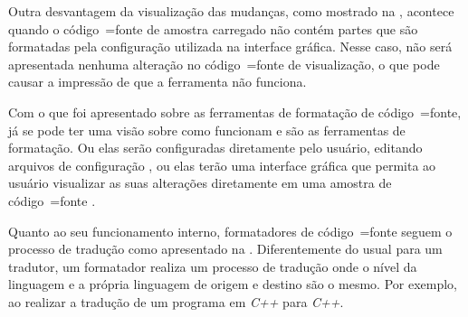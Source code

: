 Outra desvantagem da visualização das mudanças,
como mostrado na ,
acontece quando o código~=fonte de amostra carregado não contém partes que são formatadas pela configuração utilizada na interface gráfica.
Nesse caso,
não será apresentada nenhuma alteração no código~=fonte de visualização,
o que pode causar a impressão de que a ferramenta não funciona.

Com o que foi apresentado sobre as ferramentas de formatação de código~=fonte,
já se pode ter uma visão sobre como funcionam e
são as ferramentas de formatação.
Ou elas serão configuradas diretamente pelo usuário,
editando arquivos de configuração \cite{uncrustifySourceCode},
ou elas terão uma interface gráfica que permita ao usuário visualizar as suas alterações diretamente em uma amostra de código~=fonte \cite{universalIndentGUI}.

Quanto ao seu funcionamento interno,
formatadores de código~=fonte seguem o processo de tradução como apresentado na .
Diferentemente do usual para um tradutor,
um formatador realiza um processo de tradução onde o nível da linguagem e
a própria linguagem de origem e
destino são o mesmo.
Por exemplo,
ao realizar a tradução de um programa em \textit{C++} para \textit{C++}.


\section{}

